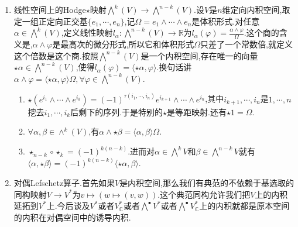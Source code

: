 \begin{enumerate}
    \begin{enumerate}[(1)]
    	\item 验证这个内积和最开始的正交基的选取无关:
    	\begin{proof}
    		
    		再选取一个正定向的标准正交基$\{\widetilde{e_1},\cdots,\widetilde{e_n}\}$,记$\widetilde{e_i}=a_i^je_j$.那么有:
    		\begin{align*}
    			\sum'_I\alpha(\widetilde{e_{i_1}},\cdots,\widetilde{e_{i_k}})\beta(\widetilde{e_{i_1}},\cdots,\widetilde{e_{i_k}})&=\sum' a_{i_1}^{j_1}a_{i_2}^{j_2}\cdots a_{i_k}^{j_k}a_{i_1}^{l_1}\cdots a_{i_k}^{l_k}\alpha(e_{j_1},\cdots,e_{j_k})\beta(e_{l_1},\cdots,e_{l_k})\\&=\sum'\delta_{j_1,l_1}\cdots\delta_{j_k,l_k}\alpha(e_{j_1},\cdots,e_{j_k})\beta(e_{l_1},\cdots,e_{l_k})\\&=\sum'\alpha(e_{i_1},\cdots,e_{i_k})\beta(e_{i_1},\cdots,e_{i_k})
    		\end{align*}
    	\end{proof}
    	\item $\{e^I\mid i_1<\cdots<i_k\}$是$\bigwedge^k(V)$上诱导内积的一组标准正交基.于是特别的$\bigwedge^{\bullet}V=\oplus_k\bigwedge^kV$是关于$\langle-,-\rangle$的正交分解.
    \end{enumerate}
    \item 线性空间上的Hodge$\star$映射$\bigwedge^k(V)\to\bigwedge^{n-k}(V)$.设$V$是$n$维定向内积空间,取定一组正定向正交基$\{e_1,\cdots,e_n\}$,记$\Omega=e_1\wedge\cdots\wedge e_n$是体积形式.对任意$\alpha\in\bigwedge^k(V)$,定义线性映射$l_{\alpha}:\bigwedge^{n-k}(V)\to\mathbb{R}$为$l_{\alpha}(\varphi)=\frac{\alpha\wedge\varphi}{\Omega}$.这个商的含义是,$\alpha\wedge\varphi$是最高次的微分形式,所以它和体积形式$\Omega$只差了一个常数倍,就定义这个倍数是这个商.按照$\bigwedge^{n-k}(V)$是一个内积空间,存在唯一的向量$\star\alpha\in\bigwedge^{n-k}(V)$,使得$l_{\alpha}(\varphi)=\langle\star\alpha,\varphi\rangle$.换句话讲$\alpha\wedge\varphi=\langle\star\alpha,\varphi\rangle\Omega,\forall\varphi\in\bigwedge^{n-k}(V)$.
    \begin{enumerate}[(1)]
    	\item $\star(e^{i_1}\wedge\cdots\wedge e^{i_k})=(-1)^{\tau(i_1,\cdots,i_n)}e^{i_{k+1}}\wedge\cdots\wedge e^{i_n}$,其中$i_{k+1},\cdots,i_n$是$1,\cdots,n$挖去$i_1,\cdots,i_k$后剩下的序列.于是特别的$\star$是等距映射.还有$\star1=\Omega$.
    	\item $\forall\alpha,\beta\in\wedge^k(V)$,有$\alpha\wedge\star\beta=\langle\alpha,\beta\rangle\Omega$.
    	\item $\star_{n-k}\circ\star_k=(-1)^{k(n-k)}$.进而对$\alpha\in\bigwedge^kV$和$\beta\in\bigwedge^{n-k}V$就有$\langle\alpha,\star\beta\rangle=(-1)^{k(n-k)}\langle\star\alpha,\beta\rangle$.
    \end{enumerate}
    \item 对偶Lefschetz算子.首先如果$V$是内积空间,那么我们有典范的不依赖于基选取的同构映射$V\to V^*$为$v\mapsto\left(w\mapsto(v,w)\right)$.这个典范同构允许我们把$V$上的内积延拓到$V^*$上.今后谈及$V^*$或者$V^*_{\mathbb{C}}$或者$\bigwedge^{\bullet}V^*$或者$\bigwedge^{\bullet}V^*_{\mathbb{C}}$上的内积就都是原本空间的内积在对偶空间中的诱导内积.
    

\end{enumerate}
